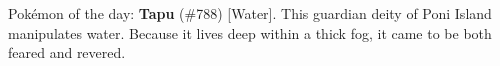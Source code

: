 Pokémon of the day:
\textbf{Tapu} (\#788) [Water].
This guardian deity of Poni Island manipulates water. Because it lives deep within a thick fog, it came to be both feared and revered.